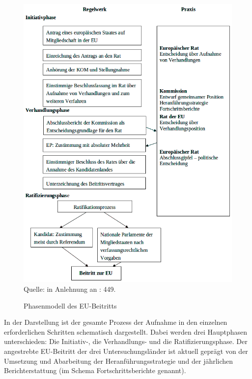 \begin{figure}[H]
  \centering

   \caption{Phasenmodell des EU-Beitritts }
  \includegraphics[width=5in]{Material/Phasenmodell_ohneRand}\\

Quelle: in Anlehnung an \cite{wessels} : 449.
\end{figure}
In der Darstellung ist der gesamte Prozess der Aufnahme in den einzelnen erforderlichen Schritten schematisch dargestellt. Dabei werden drei Hauptphasen unterschieden: Die Initiativ-, die Verhandlungs- und die Ratifizierungsphase. Der angestrebte EU-Beitritt der drei Untersuchungsländer ist aktuell geprägt von der Umsetzung und Abarbeitung der Heranführungsstrategie und der jährlichen Berichterstattung (im Schema Fortschrittsberichte genannt).\par

